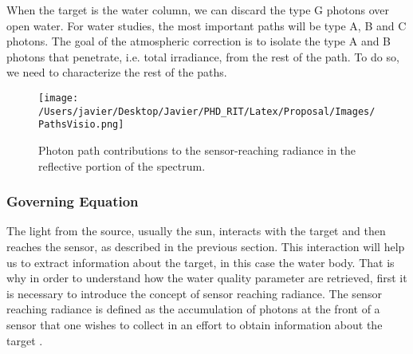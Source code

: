 When the target is the water column, we can discard the type G photons over open water. For water studies, the most important paths will be type A, B and C photons. The goal of the atmospheric correction is to isolate the type A and B photons that penetrate, i.e. total irradiance, from the rest of the path. To do so, we need to characterize the rest of the paths.

\begin{figure}[htb]
  \centering
  \texttt{[image: /Users/javier/Desktop/Javier/PHD\_RIT/Latex/Proposal/Images/PathsVisio.png]}
\caption{Photon path contributions to the sensor-reaching radiance in the reflective portion of the spectrum.}
\label{fig:paths} 
\end{figure}

\subsubsection{Governing Equation}

The light from the source, usually the sun, interacts with the target and then reaches the sensor, as described in the previous section. This interaction will help us to extract information about the target, in this case the water body. That is why in order to understand how the water quality parameter are retrieved, first it is necessary to introduce the concept of sensor reaching radiance. The sensor reaching radiance is defined as the accumulation of photons at the front of a sensor that one wishes to collect in an effort to obtain information about the target \cite{GeraceThesis}. 

